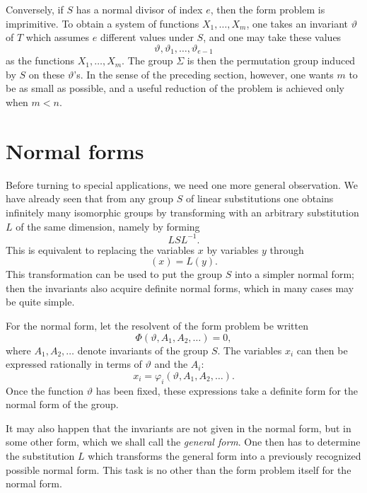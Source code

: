 \documentclass[11pt]{article}
\begin{document}
Conversely, if $S$ has a normal divisor of index $e$, then the form problem is imprimitive.  To obtain a system of functions $X_1,\ldots,X_m$, one takes an invariant $\vartheta$ of $T$ which assumes $e$ different values under $S$, and one may take these values
\[
 \vartheta,\vartheta_1,\ldots,\vartheta_{e-1}
\]
as the functions $X_1,\ldots,X_m$.  The group $\Sigma$ is then the permutation group induced by $S$ on these $\vartheta$'s.  In the sense of the preceding section, however, one wants $m$ to be as small as possible, and a useful reduction of the problem is achieved only when $m<n$.

\section{Normal forms}

Before turning to special applications, we need one more general observation.  We have already seen that from any group $S$ of linear substitutions one obtains infinitely many isomorphic groups by transforming with an arbitrary substitution $L$ of the same dimension, namely by forming
\begin{equation}\label{eq:w9-normal-transform}
 LSL^{-1}.
\end{equation}
This is equivalent to replacing the variables $x$ by variables $y$ through
\begin{equation}\label{eq:w9-xLy}
 (x)=L(y).
\end{equation}
This transformation can be used to put the group $S$ into a simpler normal form; then the invariants also acquire definite normal forms, which in many cases may be quite simple.

For the normal form, let the resolvent of the form problem be written
\begin{equation}\label{eq:w9-Phi-normal}
 \Phi(\vartheta,A_1,A_2,\ldots)=0,
\end{equation}
where $A_1,A_2,\ldots$ denote invariants of the group $S$.  The variables $x_i$ can then be expressed rationally in terms of $\vartheta$ and the $A_i$:
\begin{equation}\label{eq:w9-x-phi}
 x_i=\varphi_i(\vartheta,A_1,A_2,\ldots).
\end{equation}
Once the function $\vartheta$ has been fixed, these expressions take a definite form for the normal form of the group.

It may also happen that the invariants are not given in the normal form, but in some other form, which we shall call the \emph{general form}.  One then has to determine the substitution $L$ which transforms the general form into a previously recognized possible normal form.  This task is no other than the form problem itself for the normal form.
\end{document}
